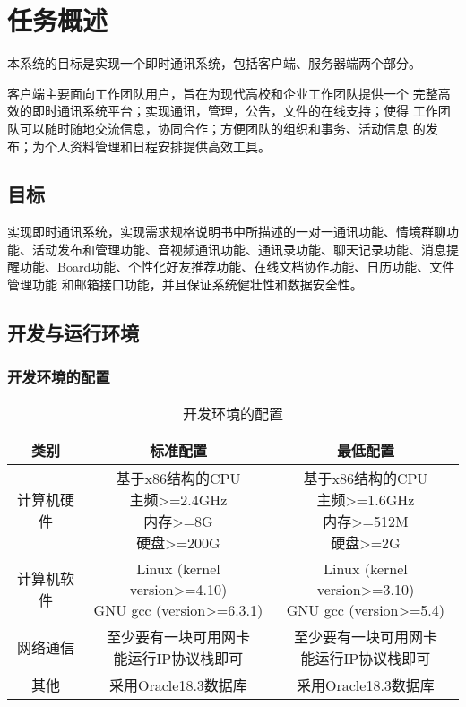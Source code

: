 \chapter{任务概述}
本系统的目标是实现一个即时通讯系统，包括客户端、服务器端两个部分。

客户端主要面向工作团队用户，旨在为现代高校和企业工作团队提供一个
完整高效的即时通讯系统平台；实现通讯，管理，公告，文件的在线支持；使得
工作团队可以随时随地交流信息，协同合作；方便团队的组织和事务、活动信息
的发布；为个人资料管理和日程安排提供高效工具。

\section{目标}
实现即时通讯系统，实现需求规格说明书中所描述的一对一通讯功能、情境群聊功能、活动发布和管理功能、音视频通讯功能、通讯录功能、聊天记录功能、消息提醒功能、Board功能、个性化好友推荐功能、在线文档协作功能、日历功能、文件管理功能
和邮箱接口功能，并且保证系统健壮性和数据安全性。

\section{开发与运行环境}

\subsection{开发环境的配置}
\begin{table}[htbp]
\centering
\caption{开发环境的配置} \label{tab:development-environment}
\begin{tabular}{|c|c|c|}
    \hline
    类别 & 标准配置 & 最低配置 \\
    \hline
    计算机硬件 & \tabincell{c}{基于x86结构的CPU\\ 主频>=2.4GHz\\ 内存>=8G\\ 硬盘>=200G} & \tabincell{c}{基于x86结构的CPU\\ 主频>=1.6GHz\\ 内存>=512M\\ 硬盘>=2G} \\
    \hline
    计算机软件 & \tabincell{c}{Linux (kernel version>=4.10)\\ GNU gcc (version>=6.3.1)} & \tabincell{c}{Linux (kernel version>=3.10)\\ GNU gcc (version>=5.4)} \\
    \hline
    网络通信 & \tabincell{c}{至少要有一块可用网卡\\ 能运行IP协议栈即可} & \tabincell{c}{至少要有一块可用网卡\\ 能运行IP协议栈即可} \\
    \hline
    其他 & 采用Oracle18.3数据库 & 采用Oracle18.3数据库 \\
    \hline
\end{tabular}
\end{table}

